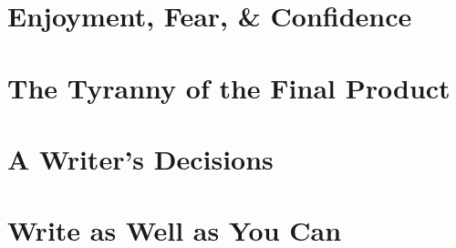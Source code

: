 \documentclass{article}
\begin{document}

\section{Enjoyment, Fear, \& Confidence}


\section{The Tyranny of the Final Product}


\section{A Writer's Decisions}


\section{Write as Well as You Can}


\printbibliography[heading=bibintoc]
\end{document}
